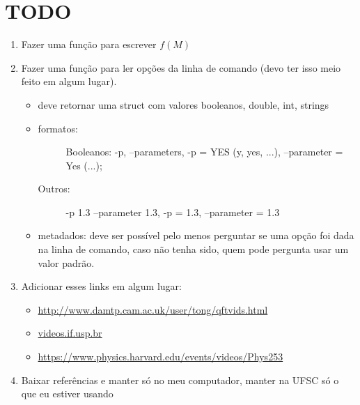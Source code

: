 \chapter{TODO}

\begin{enumerate}
\item Fazer uma função para escrever $f(M)$

\item Fazer uma função para ler opções da linha de comando (devo ter isso meio feito em algum lugar).
	\begin{itemize}
	\item deve retornar uma struct com valores booleanos, double, int, strings
	\item
		\begin{description}
			\item[formatos:] Booleanos: -p, --parameters, -p = YES (y, yes, ...), --parameter = Yes (...);
			\item[Outros:] -p 1.3 --parameter 1.3, -p = 1.3, --parameter = 1.3
		\end{description}
	\item metadados: deve ser possível pelo menos perguntar se uma opção foi dada na linha de comando, caso não tenha sido, quem pode pergunta usar um valor padrão.
	\end{itemize}

\item Adicionar esses links em algum lugar:
	\begin{itemize}
		\item \url{http://www.damtp.cam.ac.uk/user/tong/qftvids.html}
		\item \url{videos.if.usp.br}
		\item \url{https://www.physics.harvard.edu/events/videos/Phys253}
	\end{itemize}

\item Baixar referências e manter só no meu computador, manter na UFSC só o que eu estiver usando
\end{enumerate}
